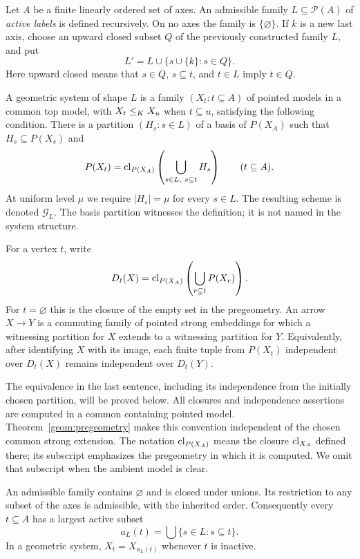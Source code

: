 \begin{definition}
\label{sys:shapes}
Let $A$ be a finite linearly ordered set of axes.  An admissible family
$L\subseteq\mathcal P(A)$ of \emph{active labels} is defined recursively.
On no axes the family is $\{\varnothing\}$.  If $k$ is a new last axis,
choose an upward closed subset $Q$ of the previously constructed family
$L$, and put
\[
 L'=L\cup\{s\cup\{k\}:s\in Q\}.
\]
Here upward closed means that $s\in Q$, $s\subseteq t$, and $t\in L$
imply $t\in Q$.

A geometric system of shape $L$ is a family
$(X_t:t\subseteq A)$ of pointed models in a common top model, with
$X_t\leq_K X_u$ when $t\subseteq u$, satisfying the following condition.
There is a partition $(H_s:s\in L)$ of a basis of $P(X_A)$ such that
$H_s\subseteq P(X_s)$ and
\begin{equation}
\label{sys:vertex-span}
 P(X_t)=\operatorname{cl}_{P(X_A)}\left(\bigcup_{s\in L,\ s\subseteq t}H_s\right)
 \qquad(t\subseteq A).
\end{equation}
At uniform level $\mu$ we require $|H_s|=\mu$ for every $s\in L$.
The resulting scheme is denoted $\mathcal G_L$.
The basis partition witnesses the definition; it is not named in the
system structure.

For a vertex $t$, write
\[
 D_t(X)=\operatorname{cl}_{P(X_A)}\left(\bigcup_{r\subsetneq t}P(X_r)\right).
\]
For $t=\varnothing$ this is the closure of the empty set in the
pregeometry.  An arrow $X\to Y$ is a commuting family of pointed strong
embeddings for which a witnessing partition for $X$ extends to a
witnessing partition for $Y$.  Equivalently, after identifying $X$ with
its image, each finite tuple from $P(X_t)$ independent over $D_t(X)$
remains independent over $D_t(Y)$.
\end{definition}

The equivalence in the last sentence, including its independence from
the initially chosen partition, will be proved below.  All closures and
independence assertions are computed in a common containing pointed
model.  Theorem~\ref{geom:pregeometry} makes this convention
independent of the chosen common strong extension.
The notation $\operatorname{cl}_{P(X_A)}$ means the closure $\operatorname{cl}_{X_A}$ defined
there; its subscript emphasizes the pregeometry in which it is
computed.  We omit that subscript when the ambient model is clear.

\begin{lemma}
\label{sys:shape-combinatorics}
An admissible family contains $\varnothing$ and is closed under unions.
Its restriction to any subset of the axes is admissible, with the
inherited order.  Consequently every $t\subseteq A$ has a largest
active subset
\[
 a_L(t)=\bigcup\{s\in L:s\subseteq t\}.
\]
In a geometric system, $X_t=X_{a_L(t)}$ whenever $t$ is inactive.
\end{lemma}

